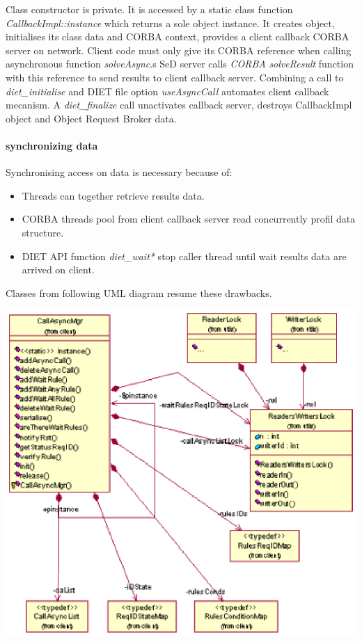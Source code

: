   Class constructor is private. It is accessed by a static class function
  \emph{CallbackImpl::instance} which returns a sole object instance. It 
  creates object, initialises its class data and CORBA context, provides a
  client callback CORBA server on network.
  Client code must only give its CORBA reference when calling asynchronous
  function \emph{solveAsync}.s
  SeD server calls \emph{CORBA} \emph{solveResult} function with this 
  reference to send results to client callback server.
  Combining  a call to \emph{diet\_initialise} and DIET file option 
  \emph{useAsyncCall} automates client callback mecanism.
  A \emph{diet\_finalize} call unactivates callback server, destroys 
  CallbackImpl object and Object Request Broker data. 

  \paragraph{synchronizing data}
  Synchronising access on data is necessary because of:
  \begin{itemize}
  \item Threads can together retrieve results data.
  \item CORBA threads pool from client callback server read concurrently
  profil data structure.
  \item DIET API function \emph{diet\_wait*} stop caller thread until wait 
  results data are arrived on client.
  \end{itemize}
  Classes from following UML diagram resume these drawbacks.

  \includegraphics{./fig/CallBackSynchronisationClassDiagram2.ps}


